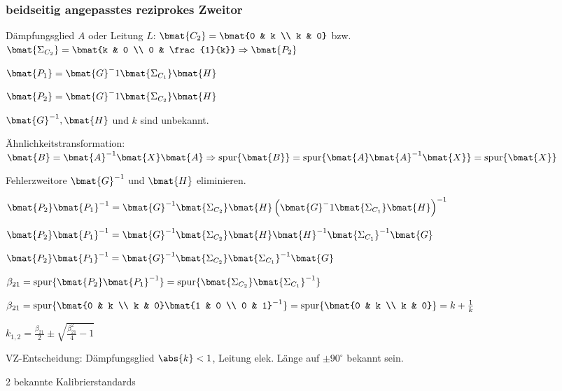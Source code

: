 \subsubsection{beidseitig angepasstes reziprokes Zweitor}
Dämpfungsglied $A$  oder Leitung $L$: $\bmat{C_2} = \bmat{0 & k \\ k & 0}$ bzw. $\bmat{\Sigma_{C_2}} = \bmat{k & 0 \\ 0 & \frac{1}{k}} \Rightarrow \bmat{P_2}$
\begin{pitemize}
    \item $\bmat{P_1} = \bmat{G}^-1\bmat{\Sigma_{C_1}}\bmat{H}$
    \item $\bmat{P_2} = \bmat{G}^-1\bmat{\Sigma_{C_2}}\bmat{H}$
\end{pitemize}
$\bmat{G}^{-1},\bmat{H}$ und $k$ sind unbekannt.

Ähnlichkeitstransformation: $\bmat{B} = \bmat{A}^{-1} \bmat{X} \bmat{A} \Rightarrow \text{spur}\{\bmat{B}\} = \text{spur}\{\bmat{A} \bmat{A}^{-1} \bmat{X}\} = \text{spur}\{\bmat{X}\}$

\begin{penumerate}
    \item Fehlerzweitore $\bmat{G}^{-1}$ und $\bmat{H}$ eliminieren.
    \begin{pitemize}
        \item $\bmat{P_2}\bmat{P_1}^{-1} = \bmat{G}^{-1}\bmat{\Sigma_{C_2}}\bmat{H}\left(\bmat{G}^-1\bmat{\Sigma_{C_1}}\bmat{H}\right)^{-1}$
        \item $\bmat{P_2}\bmat{P_1}^{-1} = \bmat{G}^{-1}\bmat{\Sigma_{C_2}}\bmat{H}\bmat{H}^{-1} \bmat{\Sigma_{C_1}}^{-1}\bmat{G}$
        \item $\bmat{P_2}\bmat{P_1}^{-1} = \bmat{G}^{-1}\bmat{\Sigma_{C_2}}\bmat{\Sigma_{C_1}}^{-1}\bmat{G}$
        \item $\beta_{21} = \text{spur}\{\bmat{P_2}\bmat{P_1}^{-1}\} = \text{spur}\{\bmat{\Sigma_{C_2}}\bmat{\Sigma_{C_1}}^{-1}\}$
        \item $\beta_{21} = \text{spur}\{\bmat{0 & k \\ k & 0}\bmat{1 & 0 \\ 0 & 1}^{-1}\} = \text{spur}\{\bmat{0 & k \\ k & 0}\} = k + \frac{1}{k}$
        \item $k_{1,2} = \frac{\beta_{21}}{2} \pm \sqrt{\frac{\beta_{21}^2}{4} - 1}$
        \item VZ-Entscheidung: Dämpfungsglied $\abs{k} < 1$, Leitung elek. Länge auf $\pm 90 ^{\circ}$ bekannt sein.
        \item 2 bekannte Kalibrierstandards
    \end{pitemize}
    
\end{penumerate}



